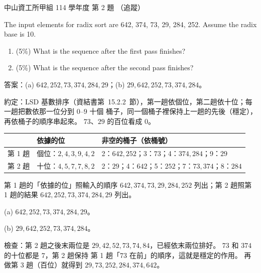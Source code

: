 \begin{pastexam}[label={px:nsysu-114-osds-02}]{中山資工所甲組 114 學年度 第 2 題}
（追蹤）

The input elements for radix sort are 642, 374, 73, 29, 284, 252. Assume the radix base is 10.
\begin{enumerate}[label=(\alph*)]
\item (5\%) What is the sequence after the first pass finishes?
\item (5\%) What is the sequence after the second pass finishes?
\end{enumerate}
\end{pastexam}

\begin{pastsoln}
答案：(a) $642, 252, 73, 374, 284, 29$；(b) $29, 642, 252, 73, 374, 284$。

約定：LSD 基數排序（資結書第~15.2.2~節），第一趟依個位，第二趟依十位；每一趟把數依那一位分到 $0$--$9$ 十個
桶子，同一個桶子裡保持上一趟的先後（穩定），再依桶子的順序串起來。 $73$、$29$ 的百位看成 $0$。

\begin{center}
\begin{tabular}{lll}
\toprule
 & 依據的位 & 非空的桶子（依桶號） \\
\midrule
第 1 趟 & 個位：$2, 4, 3, 9, 4, 2$ & 2：$642, 252$；3：$73$；4：$374, 284$；9：$29$ \\
第 2 趟 & 十位：$4, 5, 7, 7, 8, 2$ & 2：$29$；4：$642$；5：$252$；7：$73, 374$；8：$284$ \\
\bottomrule
\end{tabular}
\end{center}

第 1 趟的「依據的位」照輸入的順序 $642, 374, 73, 29, 284, 252$ 列出；第 2 趟照第 1 趟的結果
$642, 252, 73, 374, 284, 29$ 列出。

(a) $642, 252, 73, 374, 284, 29$。

(b) $29, 642, 252, 73, 374, 284$。

檢查：第 2 趟之後末兩位是 $29, 42, 52, 73, 74, 84$，已經依末兩位排好。 $73$ 和 $374$ 的十位都是 $7$，第 2 趟保持
第 1 趟「$73$ 在前」的順序，這就是穩定的作用。 再做第 3 趟（百位）就得到 $29, 73, 252, 284, 374, 642$。
\end{pastsoln}
